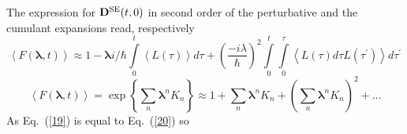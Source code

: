 \documentclass[12pt,twoside,a4paper]{report}
\begin{document}
The expression for
$\mathbf{D}
^{\rm SE}
{\left( 
       t,0
  \right) }$
in second order of the perturbative and the cumulant expansions read, respectively
\begin{equation} 
\left\langle 
    F
    \left( 
      \mathbf{\lambda },t
    \right) 
\right\rangle
                  \approx 
                              1
                           -  \mathbf{\lambda }
                              i/\hbar 
                              \int\limits_0^t
                                  \left\langle 
                                       L
                                       \left( \tau \right) 
                                   \right\rangle 
                              d\tau 
                           +  \left( 
                                 \frac{-i\lambda}\hbar 
                              \right)^2
                              \int\limits_0^t
                                  \int\limits_0^\tau 
                                       \left\langle 
                                            L
                                            \left( \tau \right) 
                                 d\tau 
                                 L
                                 \left( \tau ^{\prime }\right) 
                                       \right\rangle 
                             d\tau ^{\prime }  \label{19} 
\end{equation} 
\begin{equation} 
\left\langle 
    F
    \left( 
      \mathbf{\lambda },t
    \right) 
\right\rangle
=
\exp 
\left\{ 
    \sum
    \limits_n
    \mathbf{\lambda }
           ^n
    K_n\right\} 
                 \approx     1
                          +  \sum\limits_n 
                                 \mathbf{\lambda }^n
                                 K_n
                          +  \left( 
                                 \sum\limits_n
                                     \mathbf{\lambda }^n
                                     K_n
                             \right)^2
                          +  \ldots  \label{20} 
\end{equation} 
As Eq.~(\ref{19}) is equal to Eq.~(\ref{20}) so  
\end{document}
